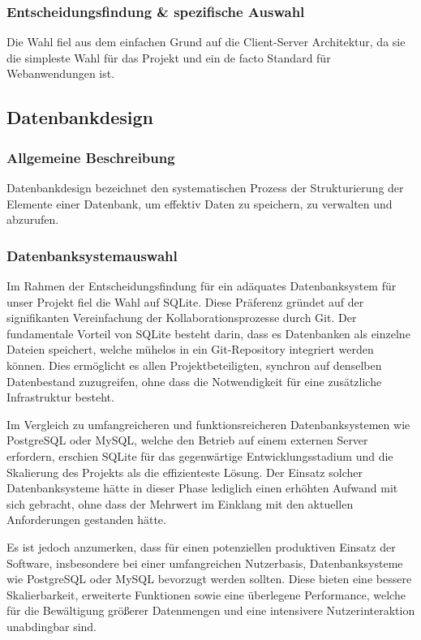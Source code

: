 \subsubsection{Entscheidungsfindung \& spezifische Auswahl}

Die Wahl fiel aus dem einfachen Grund auf die Client-Server Architektur, da sie die simpleste Wahl für das Projekt und ein de facto Standard für
Webanwendungen ist.

\subsection{Datenbankdesign}

\subsubsection{Allgemeine Beschreibung}

Datenbankdesign bezeichnet den systematischen Prozess der Strukturierung der Elemente einer Datenbank, um effektiv Daten zu speichern, zu verwalten
und abzurufen.

\subsubsection{Datenbanksystemauswahl}
Im Rahmen der Entscheidungsfindung für ein adäquates Datenbanksystem für unser Projekt fiel die Wahl auf SQLite. Diese Präferenz gründet auf der
signifikanten Vereinfachung der Kollaborationsprozesse durch Git. Der fundamentale Vorteil von SQLite besteht darin, dass es Datenbanken als einzelne
Dateien speichert, welche mühelos in ein Git-Repository integriert werden können. Dies ermöglicht es allen Projektbeteiligten, synchron auf denselben
Datenbestand zuzugreifen, ohne dass die Notwendigkeit für eine zusätzliche Infrastruktur besteht.

Im Vergleich zu umfangreicheren und funktionsreicheren Datenbanksystemen wie PostgreSQL oder MySQL, welche den Betrieb auf einem externen Server erfordern,
erschien SQLite für das gegenwärtige Entwicklungsstadium und die Skalierung des Projekts als die effizienteste Lösung. Der Einsatz solcher Datenbanksysteme
hätte in dieser Phase lediglich einen erhöhten Aufwand mit sich gebracht, ohne dass der Mehrwert im Einklang mit den aktuellen Anforderungen gestanden hätte.

Es ist jedoch anzumerken, dass für einen potenziellen produktiven Einsatz der Software, insbesondere bei einer umfangreichen Nutzerbasis, Datenbanksysteme
wie PostgreSQL oder MySQL bevorzugt werden sollten. Diese bieten eine bessere Skalierbarkeit, erweiterte Funktionen sowie eine überlegene Performance, welche
für die Bewältigung größerer Datenmengen und eine intensivere Nutzerinteraktion unabdingbar sind.

